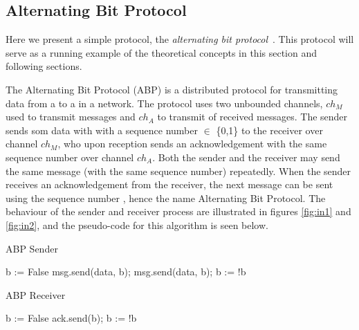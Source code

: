 \subsection{Alternating Bit Protocol}
Here we present a simple protocol, the \emph{alternating bit protocol}~\cite{bartlett1969note}. This protocol will serve as a running example of the theoretical concepts in this section and following sections.

The Alternating Bit Protocol (ABP) is a distributed protocol for transmitting data from a  to a  in a network. The protocol uses two unbounded channels, $ch_M$ used to transmit messages and $ch_A$ to transmit  of received messages. The sender sends som data with with a sequence number  $\in$ \{0,1\} to the receiver over channel $ch_M$, who upon reception sends an acknowledgement with the same sequence number over channel $ch_A$. Both the sender and the receiver may send the same message (with the same sequence number) repeatedly. When the sender receives an acknowledgement from the receiver, the next message can be sent using the sequence number , hence the name Alternating Bit Protocol. The behaviour of the sender and receiver process are illustrated in figures \ref{fig:in1} and \ref{fig:in2}, and the pseudo-code for this algorithm is seen below.

\begin{algorithm}
  \caption{ABP Sender}
  \label{senderpseudo}
\begin{algorithmic}[1]
    \State b := False 
      \State msg.send(data, b); 
       
      \State msg.send(data, b); 
      \EndWhile
      \State b := !b 
    \EndFor
\end{algorithmic}
\end{algorithm}


\begin{algorithm}
  \caption{ABP Receiver}
  \label{senderpseudo}
\begin{algorithmic}[1]
    \State b := False 
       
      \State ack.send(b); 
      \EndWhile
      \State b := !b 
    \EndFor
\end{algorithmic}
\end{algorithm}

